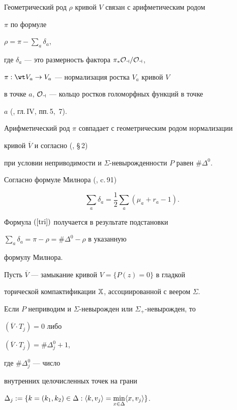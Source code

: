 \begin{pf}


Геометрический род $\rho$ кривой $V$ связан с арифметическим родом


$\pi$ по формуле


$\rho =\pi -\sum\limits_a \delta_a$,


где $\delta_a$ --- это размерность фактора $\pi_* \cal O_a/ \cal O_a$,


$\pi: \wt V_a\rightarrow V_a$ --- нормализация ростка $V_a$ кривой $V$


в точке $a$, $\cal O_a$ --- кольцо ростков голоморфных функций в точке


$a$ (\cite{S}, гл.\,IV, пп.\,5,~7).





Арифметический род $\pi$ совпадает с геометрическим родом нормализации


кривой $\overline{V}$ и согласно (\cite{H1}, \S\,2)


при условии неприводимости и $\Sigma$-невырожденности $P$ равен $\#\Delta^0$.


Согласно формуле Милнора (\cite{M}, c.\,91)


$$


\sum\limits_a \delta_a= \frac{1}{2}\sum\limits_a (\mu_a+r_a-1).


$$





Формула $(\ref{tri})$ получается в результате подстановки


$\sum\limits_a \delta_a = \pi-\rho= \#\Delta^0 -\rho$ в указанную


формулу Милнора.


\end{pf}





\begin{lem}


Пусть $\overline{V}$ --- замыкание кривой $V=\{P(z)=0\}$ в гладкой


торической компактификации $\Bbb X$, ассоциированной с веером $\Sigma$.


Если $P$ неприводим и $\Sigma$-невырожден или $\Sigma_+$-невырожден, то


$(\overline{V}\cdot T_{j})=0$ либо


$(\overline{V}\cdot T_{j})=\# \Delta_{j}^0 +1$,


где $\# \Delta_{j}^0$ --- число


внутренних целочисленных точек на грани


$\Delta_j:=


\{k=(k_1,k_2)\in \Delta: \la k,v_j\ra=


\min\limits_{x\in\Delta} \la x,v_j\ra \}$.


\end{lem}





